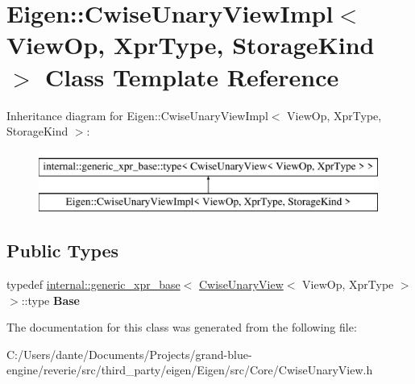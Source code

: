 \hypertarget{class_eigen_1_1_cwise_unary_view_impl}{}\section{Eigen\+::Cwise\+Unary\+View\+Impl$<$ View\+Op, Xpr\+Type, Storage\+Kind $>$ Class Template Reference}
\label{class_eigen_1_1_cwise_unary_view_impl}
Inheritance diagram for Eigen\+::Cwise\+Unary\+View\+Impl$<$ View\+Op, Xpr\+Type, Storage\+Kind $>$\+:\begin{figure}[H]
\begin{center}
\leavevmode
\includegraphics[height=2.000000cm]{class_eigen_1_1_cwise_unary_view_impl}
\end{center}
\end{figure}
\subsection*{Public Types}
\begin{DoxyCompactItemize}
\item 
\mbox{\label{class_eigen_1_1_cwise_unary_view_impl_ad6b354855853520e99dd02f2f69d2bf6}} 
typedef \mbox{\hyperlink{struct_eigen_1_1internal_1_1generic__xpr__base}{internal\+::generic\+\_\+xpr\+\_\+base}}$<$ \mbox{\hyperlink{class_eigen_1_1_cwise_unary_view}{Cwise\+Unary\+View}}$<$ View\+Op, Xpr\+Type $>$ $>$\+::type {\bfseries Base}
\end{DoxyCompactItemize}


The documentation for this class was generated from the following file\+:\begin{DoxyCompactItemize}
\item 
C\+:/\+Users/dante/\+Documents/\+Projects/grand-\/blue-\/engine/reverie/src/third\+\_\+party/eigen/\+Eigen/src/\+Core/Cwise\+Unary\+View.\+h\end{DoxyCompactItemize}
